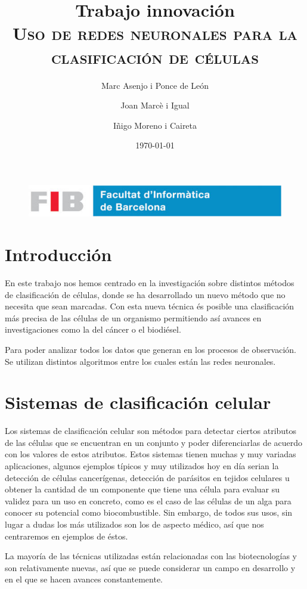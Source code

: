 \documentclass[a4paper, 12pt, UTF8]{article}
\title{
	\Huge
	\textbf{Trabajo innovación} \\
	\scshape Uso de redes neuronales para la clasificación de células
	}
\author{
	Marc Asenjo i Ponce de León \and
	Joan Marcè i Igual \and
	Iñigo Moreno i Caireta
	}
\date{\today}
\begin{document}
\maketitle

\begin{figure}
	\centering
	\includegraphics[width=\linewidth]{./simple_FIB}
\end{figure}

\newpage
\tableofcontents

\newpage

\section{Introducción}

En este trabajo nos hemos centrado en la investigación\cite{deepLearning} sobre distintos métodos de clasificación de células, donde se ha desarrollado un nuevo método que no necesita que sean marcadas. Con esta nueva técnica és posible una clasificación más precisa de las células de un organismo permitiendo así avances en investigaciones como la del cáncer o el biodiésel.

Para poder analizar todos los datos que generan en los procesos de observación. Se utilizan distintos algoritmos entre los cuales están las redes neuronales.


\section{Sistemas de clasificación celular}
Los sistemas de clasificación celular son métodos para detectar ciertos atributos de las células que se encuentran en un conjunto y poder diferenciarlas de acuerdo con los valores de estos atributos. Estos sistemas tienen muchas y muy variadas aplicaciones, algunos ejemplos típicos y muy utilizados hoy en día serian la detección de células cancerígenas, detección de parásitos en tejidos celulares u obtener la cantidad de un componente que tiene una célula para evaluar su validez para un uso en concreto, como es el caso de las células de un alga para conocer su potencial como biocombustible. Sin embargo, de todos sus usos, sin lugar a dudas los más utilizados son los de aspecto médico, así que nos centraremos en ejemplos de éstos.

La mayoría de las técnicas utilizadas están relacionadas con las biotecnologías y son relativamente nuevas, así que se puede considerar un campo en desarrollo y en el que se hacen avances constantemente.
\end{document}

